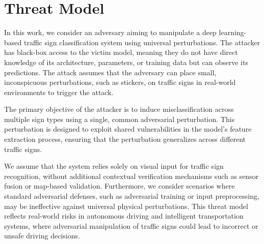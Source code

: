 \section{Threat Model}

In this work, we consider an adversary aiming to manipulate a deep learning-based traffic sign classification system using universal perturbations. The attacker has black-box access to the victim model, meaning they do not have direct knowledge of its architecture, parameters, or training data but can observe its predictions. The attack assumes that the adversary can place small, inconspicuous perturbations, such as stickers, on traffic signs in real-world environments to trigger the attack.

The primary objective of the attacker is to induce misclassification across multiple sign types using a single, common adversarial perturbation. This perturbation is designed to exploit shared vulnerabilities in the model’s feature extraction process, ensuring that the perturbation generalizes across different traffic signs.

We assume that the system relies solely on visual input for traffic sign recognition, without additional contextual verification mechanisms such as sensor fusion or map-based validation. Furthermore, we consider scenarios where standard adversarial defenses, such as adversarial training or input preprocessing, may be ineffective against universal physical perturbations. This threat model reflects real-world risks in autonomous driving and intelligent transportation systems, where adversarial manipulation of traffic signs could lead to incorrect or unsafe driving decisions.
